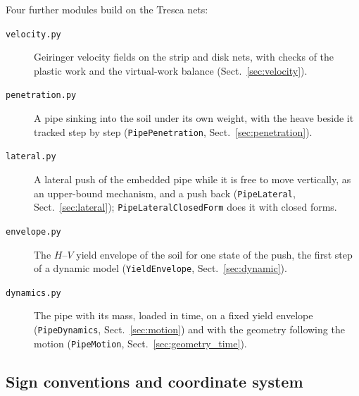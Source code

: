 \documentclass[11pt,a4paper]{article}
\begin{document}
Four further modules build on the Tresca nets:
\begin{description}
  \item[\texttt{velocity.py}] Geiringer velocity fields on the strip
        and disk nets, with checks of the plastic work and the
        virtual-work balance (Sect.~\ref{sec:velocity}).
  \item[\texttt{penetration.py}] A pipe sinking into the soil under its
        own weight, with the heave beside it tracked step by step
        (\texttt{PipePenetration}, Sect.~\ref{sec:penetration}).
  \item[\texttt{lateral.py}] A lateral push of the embedded pipe while
        it is free to move vertically, as an upper-bound mechanism,
        and a push back (\texttt{PipeLateral}, Sect.~\ref{sec:lateral});
        \texttt{PipeLateralClosedForm} does it with closed forms.
  \item[\texttt{envelope.py}] The $H$--$V$ yield envelope of the soil
        for one state of the push, the first step of a dynamic model
        (\texttt{YieldEnvelope}, Sect.~\ref{sec:dynamic}).
  \item[\texttt{dynamics.py}] The pipe with its mass, loaded in time,
        on a fixed yield envelope (\texttt{PipeDynamics},
        Sect.~\ref{sec:motion}) and with the geometry following the
        motion (\texttt{PipeMotion}, Sect.~\ref{sec:geometry_time}).
\end{description}

\subsection{Sign conventions and coordinate system}
\end{document}
